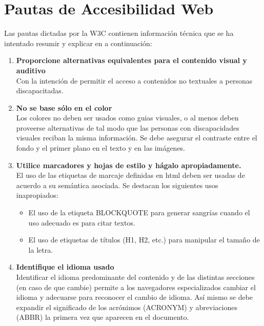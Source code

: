 \section{Pautas de Accesibilidad Web}
\label{apendice_accesibilidad}
Las pautas dictadas por la W3C \citep{AccesabilidadESC2007} contienen información técnica que se ha intentado resumir y explicar en a continuación:
\begin{enumerate}
	\item \textbf{Proporcione alternativas equivalentes para el contenido visual y auditivo}\\  Con la intención de permitir el acceso a contenidos no textuales a personas discapacitadas.
	\item \textbf{No se base sólo en el color}\\ Los colores no deben ser usados como guias visuales, o al menos deben proveerse alternativas de tal modo que las personas con discapacidades visuales reciban la misma información. Se debe asegurar el contraste entre el fondo y el primer plano en el texto y en las imágenes.
	\item \textbf{Utilice marcadores y hojas de estilo y hágalo apropiadamente.}\\ El uso de las etiquetas de marcaje definidas en html deben ser usadas de acuerdo a su semántica asociada. Se destacan los siguientes usos inapropiados:
	\begin{itemize}
	\item El uso de la etiqueta BLOCKQUOTE para generar sangrías cuando el uso adecuado es para citar textos.
	\item El uso de etiquetas de títulos (H1, H2, etc.) para manipular el tamaño de la letra.
	\end{itemize}
	\item \textbf{Identifique el idioma usado}\\ Identificar el idioma predominante del contenido y de las distintas secciones (en caso de que cambie) permite a los navegadores especializados cambiar el idioma y adecuarse para reconocer el cambio de idioma. Así mismo se debe expandir el significado de los acrónimos (ACRONYM) y abreviaciones (ABBR) la primera vez que aparecen en el documento.

\end{enumerate}
